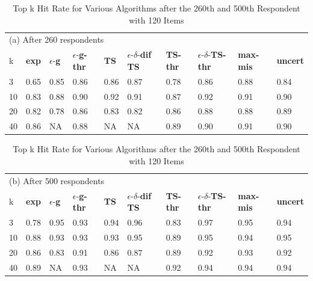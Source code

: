 \documentclass[a4paper,12pt]{article}
\newcommand{\fixedexpressS}{\textbf{exp}}
\newcommand{\egreedyS}{$\epsilon$-\textbf{g}}
\newcommand{\egreedythresS}{$\epsilon$-\textbf{g-thr}}
\newcommand{\misminS}{\textbf{max-mis}}
\newcommand{\tsS}{\textbf{TS} }
\newcommand{\edtsS}{$\epsilon$-$\delta$-\textbf{dif TS} }
\newcommand{\tsthresS}{\textbf{TS-thr} }
\newcommand{\edtsthresS}{$\epsilon$-$\delta$-\textbf{TS-thr} }
\newcommand{\uncertS}{\textbf{uncert} }
\begin{document}
\begin{table}
\caption{Top k Hit Rate for Various Algorithms after the 260th and 500th Respondent with 120 Items }
\label{table:at_260_500}
\begin{center}
\begin{tabular}{llllllllll}
\hline 
\hline
\multicolumn{10}{l}{(a) After 260 respondents}\\
k &  \fixedexpressS&\egreedyS&\egreedythresS&\tsS&\edtsS&\tsthresS&\edtsthresS& \misminS& \uncertS \\ \hline
  3 & 0.65 &   0.85 &  0.86 &   0.86 & 0.87 & 0.78 & 0.86 &    0.88 &   0.84 \\
  10 &  0.83 &   0.88 & 0.90 &   0.92 & 0.91 & 0.87 & 0.92 &    0.91 &   0.90 \\
  20 & 0.82 & 0.78 &  0.86 & 0.83 & 0.82 & 0.86 & 0.88 &  0.88 &   0.89 \\  
  40 &  0.86 &   NA &  0.88 &  NA & NA & 0.89 & 0.90 &  0.91 &   0.90 \\
\hline
\hline
\end{tabular}
\begin{tabular}{llllllllll}
\multicolumn{10}{l}{(b) After 500 respondents}\\
k &  \fixedexpressS&\egreedyS&\egreedythresS&\tsS&\edtsS&\tsthresS&\edtsthresS& \misminS& \uncertS  \\
\hline
   3 & 0.78 &   0.95 & 0.93 & 0.94 & 0.96 & 0.83 & 0.97 &    0.95 &   0.94 \\
  10 &  0.88 &   0.93 &  0.93 &   0.93 & 0.95 & 0.89 & 0.95 &    0.94 &   0.95 \\  
  20 &  0.86 &   0.83 & 0.91 &  0.86 & 0.87 & 0.89 & 0.92 &  0.93 &   0.92 \\ 
  40 &  0.89 &   NA & 0.93 & NA & NA & 0.92 &  0.94 & 0.94 & 0.94 \\
\hline 
\hline
\end{tabular}
\end{center}
\end{table}




\end{document}
